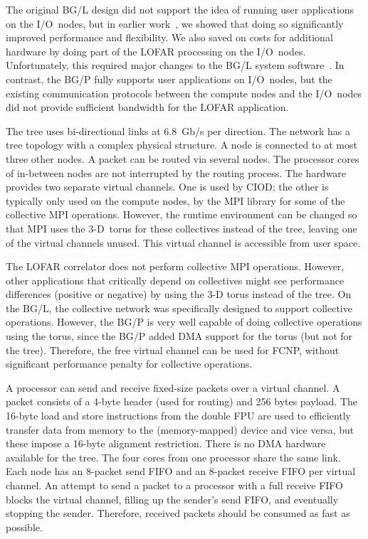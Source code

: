 \documentclass[journal]{IEEEtran}
\begin{document}
The original BG/L design did not support the idea of running user applications
on the I/O~nodes, but in earlier work~\cite{Iskra:08}, we showed that doing so 
significantly improved performance and flexibility.
We also saved on costs for additional hardware by doing part of the LOFAR
processing on the I/O~nodes.
Unfortunately, this required major changes to the BG/L system
software~\cite{Iskra:08,Boonstoppel:08}.
In contrast, the BG/P fully supports user applications on I/O~nodes, but
the existing communication protocols between the compute nodes and the
I/O~nodes did not provide sufficient bandwidth for the LOFAR application.

The tree uses bi-directional links at 6.8~Gb/s per direction.
The network has a tree topology with a complex physical structure.
A node is connected to at most three other nodes.
A packet can be routed via several nodes.
The processor cores of in-between nodes are not interrupted by the routing
process.
The hardware provides two separate virtual channels.
One is used by CIOD;
the other is typically only used on the compute nodes, by the MPI library for
some of the collective MPI operations.
However, the runtime environment can be changed so that MPI uses the
3-D~torus for these collectives instead of the tree, leaving one of the virtual
channels unused.
This virtual channel is accessible from user space.

The LOFAR correlator does not perform collective MPI operations.
However, other applications that critically depend on collectives might
see performance differences (positive or negative) by using the 3-D torus
instead of the tree.
On the BG/L, the collective network was specifically designed to
support collective operations.
However, the BG/P is very well capable of doing collective operations
using the torus, since the BG/P added DMA support for the torus
(but not for the tree).
Therefore, the free virtual channel can be used for FCNP, without
significant performance penalty for collective operations.

A processor can send and receive fixed-size packets over a virtual channel.
A packet consists of a 4-byte header (used for routing) and 256 bytes payload.
The 16-byte load and store instructions from the double FPU are used to
efficiently transfer data from memory to the (memory-mapped) device and vice
versa, but these impose a 16-byte alignment restriction.
There is no DMA hardware available for the tree.
The four cores from one processor share the same link.
Each node has an 8-packet send FIFO and an 8-packet receive FIFO per virtual
channel.
An attempt to send a packet to a processor with a full receive FIFO blocks
the virtual channel, filling up the sender's send FIFO, and eventually stopping
the sender.
Therefore, received packets should be consumed as fast as possible.
\end{document}
